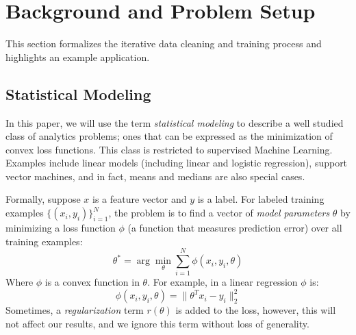 \section{Background and Problem Setup}\label{background}
This section formalizes the iterative data cleaning and training process and highlights an example application.

\subsection{Statistical Modeling}
In this paper, we will use the term \emph{statistical modeling} to describe a well studied class of analytics problems; ones that can be expressed as the minimization of convex loss functions.
This class is restricted to supervised Machine Learning.
Examples include linear models (including linear and logistic regression), support vector machines, and in fact, means and medians are also special cases. 

Formally, suppose $x$ is a feature vector and $y$ is a label.
For labeled training examples $\{(x_{i},y_{i})\}_{i=1}^{N}$, the problem is to find a vector of \emph{model parameters} $\theta$ by minimizing a loss function $\phi$ (a function that measures prediction error) over all training examples:
\[
 \theta^{*}=\arg\min_{\theta}\sum_{i=1}^{N}\phi(x_{i},y_{i},\theta)
\]
Where $\phi$ is a convex function in $\theta$.
For example, in a linear regression $\phi$ is:
\[
\phi(x_{i},y_{i},\theta) = \|\theta^Tx_{i} - y_i \|_2^2
\]
Sometimes, a \emph{regularization} term $r(\theta)$ is added to the loss, however, this will not affect our results, and we ignore this term without loss of generality.

\vspace{2em}

